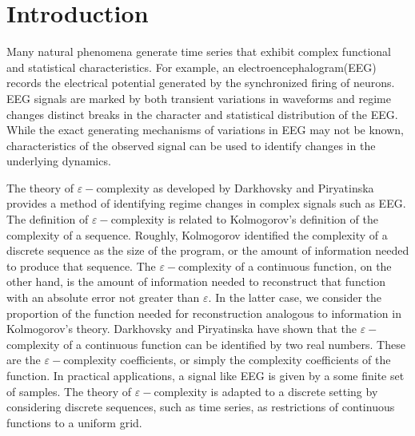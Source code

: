 
% 

% 

\chapter{Introduction}

Many natural phenomena generate time series that
exhibit complex functional and statistical 
characteristics.
For example, an electroencephalogram(EEG) records
the electrical potential generated by the synchronized
firing of neurons. EEG signals are marked by both transient 
variations in waveforms and regime changes \textemdash distinct
breaks in the character and statistical distribution
of the EEG.
While the exact generating mechanisms of
variations in EEG may not be known, characteristics
 of the observed signal can be 
used to identify changes in the underlying dynamics.

The theory of $\varepsilon-$complexity as developed by 
Darkhovsky and Piryatinska provides a method
of identifying regime changes
in complex signals such as EEG.
The definition of $\varepsilon-$complexity is related 
to Kolmogorov's definition of the complexity of a sequence.
Roughly, Kolmogorov identified the complexity
of a discrete sequence as the size of the program, or the amount of information needed to produce that sequence. 
The $\varepsilon-$complexity of a continuous function, 
on the other hand, is the amount of information needed to reconstruct
that function with an absolute error not greater than 
$\varepsilon$. In the latter case, we consider the proportion 
of the function needed for reconstruction analogous
to information in Kolmogorov's theory.
Darkhovsky and Piryatinska have shown that the 
$\varepsilon-$complexity of a continuous function 
can be identified by two real numbers\cite{darkhovsky2013}. 
These are the 
$\varepsilon-$complexity coefficients, or simply the 
complexity coefficients of the function.
In practical applications, a signal like EEG is given by a
some finite set of samples. 
The theory of $\varepsilon-$complexity is adapted to a 
discrete setting by considering discrete sequences, such
as time series, as restrictions of continuous functions 
to a uniform grid.

